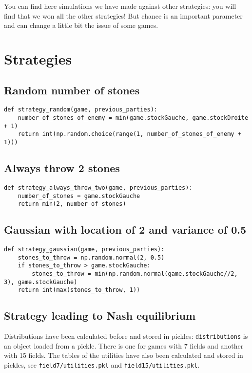 \documentclass{article}%
\begin{document}
You can find here simulations we have made against other strategies: you will find that we won all the other strategies! But chance is an important parameter and can change a little bit the issue of some games.
\section{Strategies}
\subsection{Random number of stones}

\begin{verbatim}
def strategy_random(game, previous_parties):
	number_of_stones_of_enemy = min(game.stockGauche, game.stockDroite + 1)
	return int(np.random.choice(range(1, number_of_stones_of_enemy + 1)))
\end{verbatim}

\subsection{Always throw 2 stones}

\begin{verbatim}
def strategy_always_throw_two(game, previous_parties):
	number_of_stones = game.stockGauche
	return min(2, number_of_stones)
\end{verbatim}

\subsection{Gaussian with location of 2 and variance of 0.5}

\begin{verbatim}
def strategy_gaussian(game, previous_parties):
	stones_to_throw = np.random.normal(2, 0.5)
	if stones_to_throw > game.stockGauche:
		stones_to_throw = min(np.random.normal(game.stockGauche//2, 3), game.stockGauche)
	return int(max(stones_to_throw, 1))
\end{verbatim}

\subsection{Strategy leading to Nash equilibrium}

Distributions have been calculated before and stored in pickles: \texttt{distributions} is an object loaded from a pickle. There is one for games with 7 fields and another with 15 fields. The tables of the utilities have also been calculated and stored in pickles, see \texttt{field7/utilities.pkl} and \texttt{field15/utilities.pkl}.
\end{document}
